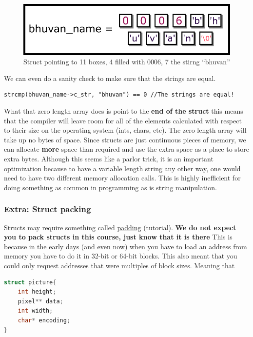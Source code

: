 \begin{figure}[H]
\centering
\includegraphics[width=.7\textwidth]{introc/drawings/memory_model_full.png}
\caption{Struct pointing to 11 boxes, 4 filled with 0006, 7 the stirng ``bhuvan''}
\end{figure}

We can even do a sanity check to make sure that the strings are equal.

\begin{verbatim}
strcmp(bhuvan_name->c_str, "bhuvan") == 0 //The strings are equal!
\end{verbatim}

What that zero length array does is point to the \textbf{end of the struct} this means that the compiler will leave room for all of the elements calculated with respect to their size on the operating system (ints, chars, etc).
The zero length array will take up no bytes of space.
Since structs are just continuous pieces of memory, we can allocate \textbf{more} space than required and use the extra space as a place to store extra bytes.
Although this seems like a parlor trick, it is an important optimization because to have a variable length string any other way, one would need to have two different memory allocation calls.
This is highly inefficient for doing something as common in programming as is string manipulation.

\subsubsection{Extra: Struct packing}

Structs may require something called \href{http://www.catb.org/esr/structure-packing/}{padding} (tutorial).
\textbf{We do not expect you to pack structs in this course, just know that it is there} This is because in the early days (and even now) when you have to load an address from memory you have to do it in 32-bit or 64-bit blocks.
This also meant that you could only request addresses that were multiples of block sizes.
Meaning that

\begin{lstlisting}[language=C]
struct picture{
    int height;
    pixel** data;
    int width;
    char* encoding;
}
\end{lstlisting}

